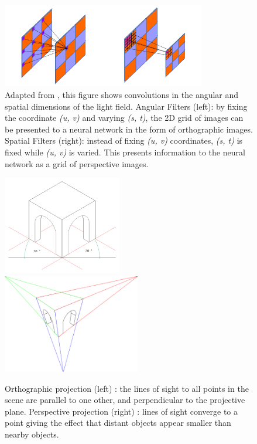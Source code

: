 \begin{figure}
    \centering 
    \includegraphics[width=3.5in]{images/spatial-angular.png}
    \caption[Spatial and angular convolutional filters for convolving over light fields]{Adapted from \cite{wang2016lfcnn}, this figure shows convolutions in the angular and spatial dimensions of the light field. Angular Filters (left): by fixing the coordinate \textit{(u, v)} and varying \textit{(s, t)}, the 2D grid of images can be presented to a neural network in the form of orthographic images. Spatial Filters (right): instead of fixing \textit{(u, v)} coordinates, \textit{(s, t)} is fixed while \textit{(u, v)} is varied. This presents information to the neural network as a grid of perspective images.}
    \label{spatial-angular}
\end{figure}


\begin{figure}
    \centering 
    \includegraphics[height=1.7in]{images/orthographic.png}
    \includegraphics[height=1.7in]{images/perspective.png}
    \caption[Orthographic and pinhole projection images]{Orthographic projection (left) \cite{behrendt2006isometric}: the lines of sight to all points in the scene are parallel to one other, and perpendicular to the projective plane. Perspective projection (right) \cite{gothe2009perspective}: lines of sight converge to a point giving the effect that distant objects appear smaller than nearby objects.}
\end{figure}

